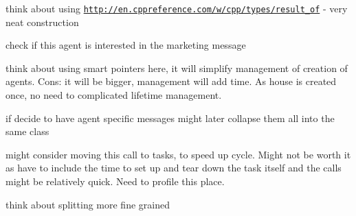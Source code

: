 
\begin{DoxyRefList}
\item[\label{_dev_stage3__DevStage3000002}%
\hypertarget{_dev_stage3__DevStage3000002}{}%
Class \hyperlink{classsolar__core_1_1_household}{solar\+\_\+core\+:\+:Household} ]think about using \href{http://en.cppreference.com/w/cpp/types/result_of}{\tt http\+://en.\+cppreference.\+com/w/cpp/types/result\+\_\+of} -\/ very neat construction 
\item[\label{_dev_stage3__DevStage3000001}%
\hypertarget{_dev_stage3__DevStage3000001}{}%
Member \hyperlink{classsolar__core_1_1_household_ac9d26af7b52f0cdc357fc5dca4b86ad9}{solar\+\_\+core\+:\+:Household\+:\+:get\+\_\+inf} (std\+::shared\+\_\+ptr$<$ Mes\+Marketing\+S\+E\+I $>$ mes\+\_\+) override]check if this agent is interested in the marketing message  
\item[\label{_dev_stage3__DevStage3000003}%
\hypertarget{_dev_stage3__DevStage3000003}{}%
Member \hyperlink{classsolar__core_1_1_household_ad7ec15745665433a5f9f174e8618bdc7}{solar\+\_\+core\+:\+:Household\+:\+:project\+\_\+states\+\_\+to\+\_\+delete} ]think about using smart pointers here, it will simplify management of creation of agents. Cons\+: it will be bigger, management will add time. As house is created once, no need to complicated lifetime management.  
\item[\label{_dev_stage3__DevStage3000004}%
\hypertarget{_dev_stage3__DevStage3000004}{}%
Class \hyperlink{classsolar__core_1_1_mes_state_base_h_h}{solar\+\_\+core\+:\+:Mes\+State\+Base\+H\+H} ]if decide to have agent specific messages might later collapse them all into the same class 
\item[\label{_dev_stage3__DevStage3000005}%
\hypertarget{_dev_stage3__DevStage3000005}{}%
Member \hyperlink{classsolar__core_1_1_w_a08283dbea7c7f3fe8b7f094a96f73a78}{solar\+\_\+core\+:\+:W\+:\+:life\+\_\+hhs} ()]might consider moving this call to tasks, to speed up cycle. Might not be worth it as have to include the time to set up and tear down the task itself and the calls might be relatively quick. Need to profile this place.  
\item[\label{_dev_stage3__DevStage3000006}%
\hypertarget{_dev_stage3__DevStage3000006}{}%
Member \hyperlink{classsolar__core_1_1_w_ab6349cbc751747a05618dad4ebb1b726}{solar\+\_\+core\+:\+:W\+:\+:sems} ]think about splitting more fine grained 
\end{DoxyRefList}